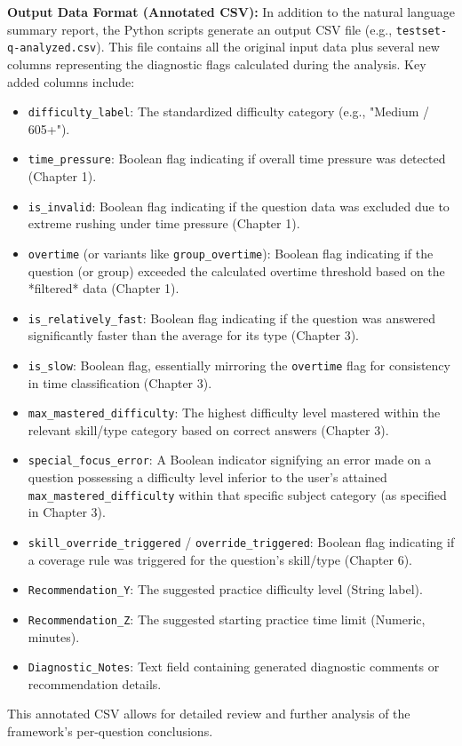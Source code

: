 \documentclass{article}
\begin{document}
\textbf{Output Data Format (Annotated CSV):}
In addition to the natural language summary report, the Python scripts generate an output CSV file (e.g., \texttt{testset-q-analyzed.csv}). This file contains all the original input data plus several new columns representing the diagnostic flags calculated during the analysis. Key added columns include:

\begin{itemize}
    \item \texttt{difficulty\_label}: The standardized difficulty category (e.g., "Medium / 605+").
    \item \texttt{time\_pressure}: Boolean flag indicating if overall time pressure was detected (Chapter 1).
    \item \texttt{is\_invalid}: Boolean flag indicating if the question data was excluded due to extreme rushing under time pressure (Chapter 1).
    \item \texttt{overtime} (or variants like \texttt{group\_overtime}): Boolean flag indicating if the question (or group) exceeded the calculated overtime threshold based on the *filtered* data (Chapter 1).
    \item \texttt{is\_relatively\_fast}: Boolean flag indicating if the question was answered significantly faster than the average for its type (Chapter 3).
    \item \texttt{is\_slow}: Boolean flag, essentially mirroring the \texttt{overtime} flag for consistency in time classification (Chapter 3).
    \item \texttt{max\_mastered\_difficulty}: The highest difficulty level mastered within the relevant skill/type category based on correct answers (Chapter 3).
    \item \texttt{special\_focus\_error}: A Boolean indicator signifying an error made on a question possessing a difficulty level inferior to the user's attained \texttt{max\_mastered\_difficulty} within that specific subject category (as specified in Chapter 3).
    \item \texttt{skill\_override\_triggered} / \texttt{override\_triggered}: Boolean flag indicating if a coverage rule was triggered for the question's skill/type (Chapter 6).
    \item \texttt{Recommendation\_Y}: The suggested practice difficulty level (String label).
    \item \texttt{Recommendation\_Z}: The suggested starting practice time limit (Numeric, minutes).
    \item \texttt{Diagnostic\_Notes}: Text field containing generated diagnostic comments or recommendation details.
\end{itemize}
This annotated CSV allows for detailed review and further analysis of the framework's per-question conclusions.
\end{document}
